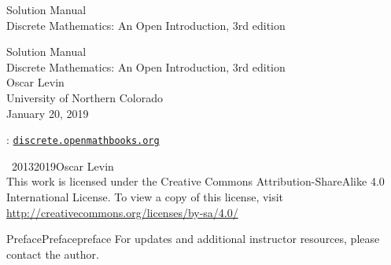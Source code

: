 \documentclass[twoside,11pt,]{book}
\newcommand{\mono}[1]{\texttt{#1}}
\numberwithin{equation}{chapter}
\begin{document}
\frontmatter
\thispagestyle{empty}
{\centering
\vspace*{0.28\textheight}
{\Huge Solution Manual}\\[2\baselineskip]
{\LARGE Discrete Mathematics: An Open Introduction, 3rd edition}\\
}
\clearpage
\thispagestyle{empty}
\null%
\clearpage
\thispagestyle{empty}
{\centering
\vspace*{0.14\textheight}
{\Huge Solution Manual}\\[\baselineskip]
{\LARGE Discrete Mathematics: An Open Introduction, 3rd edition}\\[3\baselineskip]
{\Large Oscar Levin}\\[0.5\baselineskip]
{\Large University of Northern Colorado}\\[3\baselineskip]
{\Large January 20, 2019}\\}
\clearpage
\thispagestyle{empty}
\hypertarget{colophon-1}{}
: \href{http://discrete.openmathbooks.org}{\mono{discrete.openmathbooks.org}}\par\medskip
\noindent\textcopyright\ 2013\textendash{}2019\quad{}Oscar Levin\\[0.5\baselineskip]
 This work is licensed under the Creative Commons Attribution-ShareAlike 4.0 International License. To view a copy of this license, visit \href{http://creativecommons.org/licenses/by-sa/4.0/}{http://creativecommons.org/licenses/by-sa/4.0/}\par\medskip
{}
\null\clearpage
%
%
\typeout{************************************************}
\typeout{************************************************}
%
\begin{preface}{Preface}{}{Preface}{}{}{preface}
\hypertarget{p-1}{}%
For updates and additional instructor resources, please contact the author.%
\end{preface}
\setcounter{tocdepth}{2}
\renewcommand*\contentsname{Contents}
\tableofcontents
\mainmatter
\end{document}
